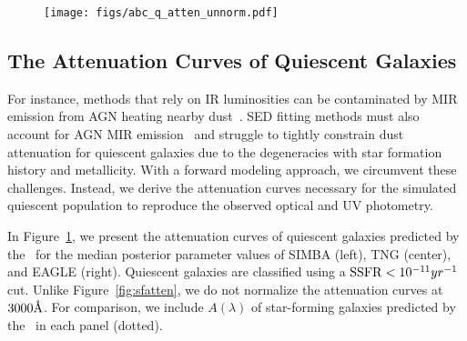 \begin{figure}
\begin{center}
    \texttt{[image: figs/abc\_q\_atten\_unnorm.pdf]}
    \caption{\label{fig:q_raw_atten}
    }
\end{center}
\end{figure}
\subsection{The Attenuation Curves of Quiescent Galaxies}  
For instance, methods that rely on IR luminosities can be contaminated by MIR
emission from AGN heating nearby dust~\citep{kirkpatrick2015}. 
SED fitting methods must also account for AGN MIR
emission~\citep{salim2016, leja2018, salim2018} and struggle to tightly
constrain dust attenuation for quiescent galaxies due to the degeneracies
with star formation history and metallicity.
With a forward modeling approach, we circumvent these challenges. 
Instead, we derive the attenuation curves necessary for the simulated quiescent
population to reproduce the observed optical and UV photometry. 

In Figure~\ref{fig:q_raw_atten}, we present the attenuation curves of
quiescent galaxies predicted by the \eda~for the median posterior parameter
values of SIMBA (left), TNG (center), and EAGLE (right). 
Quiescent galaxies are classified using a ${\rm SSFR} < 10^{-11}{yr}^{-1}$ cut. 
Unlike Figure~\ref{fig:sfatten}, we do not normalize the attenuation curves at
$3000\AA$.  
For comparison, we include $A(\lambda)$ of star-forming galaxies predicted
by the \eda~in each panel (dotted).

